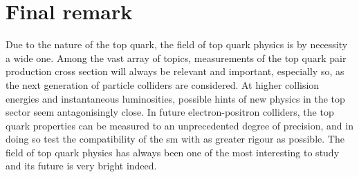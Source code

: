 
\section{Final remark} %
\label{sec:final_remark}

Due to the nature of the top quark, the field of top quark physics is by necessity a wide one.
Among the vast array of topics, measurements of the top quark pair production cross section will always be relevant and important, especially so, as the next generation of particle colliders are considered.
At higher collision energies and instantaneous luminosities, possible hints of new physics in the top sector seem antagonisingly close.
In future electron-positron colliders, the top quark properties can be measured to an unprecedented degree of precision, and in doing so test the compatibility of the \acrshort{sm} with as greater rigour as possible.
The field of top quark physics has always been one of the most interesting to study and its future is very bright indeed.




